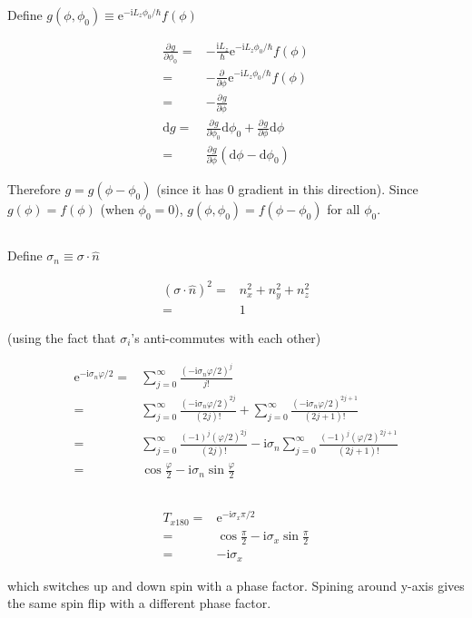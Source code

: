 \documentclass[10pt,fleqn]{article}
\newcommand{\ud}{\mathrm{d}}
\newcommand{\ue}{\mathrm{e}}
\newcommand{\ui}{\mathrm{i}}
\newcommand{\eqar}[1]
{
  \begin{align*}
    #1
  \end{align*}
}
\newcommand{\paren}[1]{{\left({#1}\right)}}
\newcommand{\pdiff}[3][{}]{{\frac{\partial^{#1} {#2}}{\partial {#3}{}^{#1}}}}
\begin{document}
\section{}
\subsection{}
Define $g(\phi, \phi_0)\equiv\ue^{-\ui L_z\phi_0/\hbar}f(\phi)$
\eqar{
  \pdiff{g}{\phi_0}=&-\frac{\ui L_z}{\hbar}\ue^{-\ui L_z\phi_0/\hbar}f(\phi)\\
  =&-\pdiff{}{\phi}\ue^{-\ui L_z\phi_0/\hbar}f(\phi)\\
  =&-\pdiff{g}{\phi}\\
  \ud g=&\pdiff{g}{\phi_0}\ud\phi_0+\pdiff{g}{\phi}\ud\phi\\
  =&\pdiff{g}{\phi}\paren{\ud\phi-\ud\phi_0}
}
Therefore $g=g(\phi-\phi_0)$ (since it has $0$ gradient in this direction).
Since $g(\phi) = f(\phi)$ (when $\phi_0 = 0$), $g(\phi, \phi_0) = f(\phi - \phi_0)$ for all $\phi_0$.
\subsection{}
Define $\sigma_n\equiv\sigma\cdot\hat n$
\eqar{
  \paren{\sigma\cdot\hat n}^2=&n_x^2 + n_y^2 + n_z^2\\
  =&1
}
(using the fact that $\sigma_i$'s anti-commutes with each other)
\eqar{
  \ue^{-\ui\sigma_n\varphi/2}=&\sum_{j=0}^\infty\frac{\paren{-\ui\sigma_n\varphi/2}^j}{j!}\\
  =&\sum_{j=0}^\infty\frac{\paren{-\ui\sigma_n\varphi/2}^{2j}}{(2j)!}+\sum_{j=0}^\infty\frac{\paren{-\ui\sigma_n\varphi/2}^{2j+1}}{(2j+1)!}\\
  =&\sum_{j=0}^\infty\frac{\paren{-1}^{j}\paren{\varphi/2}^{2j}}{(2j)!}-\ui\sigma_n\sum_{j=0}^\infty\frac{\paren{-1}^{j}\paren{\varphi/2}^{2j+1}}{(2j+1)!}\\
  =&\cos\frac{\varphi}{2}-\ui\sigma_n\sin\frac{\varphi}{2}
}
\subsection{}
\eqar{
  T_{x180}=&\ue^{-\ui\sigma_x\pi/2}\\
  =&\cos\frac{\pi}{2}-\ui\sigma_x\sin\frac{\pi}{2}\\
  =&-\ui\sigma_x
}
which switches up and down spin with a phase factor. Spining around y-axis gives the same spin flip with a different phase factor.
\subsection{}
\subsection{}
\section{}
\subsection{}
\subsection{}
\subsection{}
\end{document}
